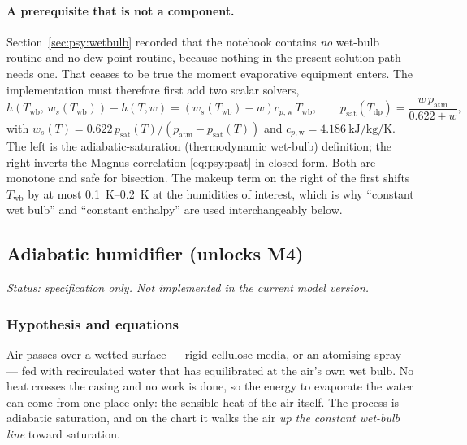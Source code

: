 \documentclass[11pt]{article}
\newcommand{\patm}{\ensuremath{p_{\mathrm{atm}}}}
\newcommand{\psat}{\ensuremath{p_{\mathrm{sat}}}}
\begin{document}
\paragraph{A prerequisite that is not a component.}
Section~\ref{sec:psy:wetbulb} recorded that the notebook contains \emph{no} wet-bulb routine and no
dew-point routine, because nothing in the present solution path needs one. That ceases to be true
the moment evaporative equipment enters. The implementation must therefore first add two scalar
solvers,
\begin{equation}
h\!\left(T_{\mathrm{wb}},\, w_{s}(T_{\mathrm{wb}})\right) - h(T,w)
 = \left(w_{s}(T_{\mathrm{wb}}) - w\right) c_{p,\mathrm{w}}\,T_{\mathrm{wb}} ,
\qquad
\psat(T_{\mathrm{dp}}) = \frac{w\,\patm}{0.622 + w} ,
\label{eq:spec:wbdp}
\end{equation}
with $w_{s}(T) = 0.622\,\psat(T)/(\patm-\psat(T))$ and
$c_{p,\mathrm{w}}=\SI{4.186}{\kilo\joule\per\kilogram\per\kelvin}$. The left is the
adiabatic-saturation (thermodynamic wet-bulb) definition; the right inverts the Magnus correlation
\eqref{eq:psy:psat} in closed form. Both are monotone and safe for bisection. The makeup term on the
right of the first shifts $T_{\mathrm{wb}}$ by at most \SIrange{0.1}{0.2}{\kelvin} at the humidities
of interest, which is why ``constant wet bulb'' and ``constant enthalpy'' are used interchangeably
below.

\subsection{Adiabatic humidifier (unlocks M4)}
\label{sec:spec:hum}

\emph{Status: specification only. Not implemented in the current model version.}

\subsubsection{Hypothesis and equations}
Air passes over a wetted surface --- rigid cellulose media, or an atomising spray --- fed with
recirculated water that has equilibrated at the air's own wet bulb. No heat crosses the casing and no
work is done, so the energy to evaporate the water can come from one place only: the sensible heat of
the air itself. The process is adiabatic saturation, and on the chart it walks the air \emph{up the
constant wet-bulb line} toward saturation.
\end{document}
